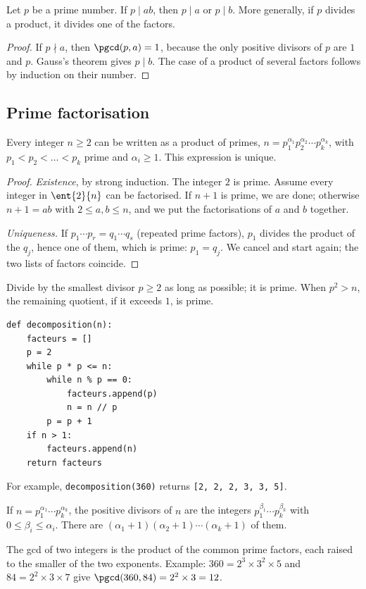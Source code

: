 \begin{theorem}
Let $p$ be a prime number. If $p\mid ab$, then $p\mid a$ or $p\mid b$. More generally, if $p$ divides a product, it divides one of the factors.
\end{theorem}
\begin{proof}
If $p\nmid a$, then $\pgcd(p,a)=1$, because the only positive divisors of $p$ are $1$ and $p$. Gauss's theorem gives $p\mid b$. The case of a product of several factors follows by induction on their number.
\end{proof}

\subsection{Prime factorisation}
\begin{theorem}[Factorisation]
Every integer $n\ge2$ can be written as a product of primes, $n=p_1^{\alpha_1}p_2^{\alpha_2}\cdots p_k^{\alpha_k}$, with $p_1<p_2<\dots<p_k$ prime and $\alpha_i\ge1$. This expression is unique.
\end{theorem}
\begin{proof}
\emph{Existence}, by strong induction. The integer $2$ is prime. Assume every integer in $\ent{2}{n}$ can be factorised. If $n+1$ is prime, we are done; otherwise $n+1=ab$ with $2\le a,b\le n$, and we put the factorisations of $a$ and $b$ together.\par
\emph{Uniqueness.} If $p_1\cdots p_r=q_1\cdots q_s$ (repeated prime factors), $p_1$ divides the product of the $q_j$, hence one of them, which is prime: $p_1=q_j$. We cancel and start again; the two lists of factors coincide.
\end{proof}
\begin{keypoint}
Divide by the smallest divisor $p\ge2$ as long as possible; it is prime. When $p^2>n$, the remaining quotient, if it exceeds $1$, is prime.
\begin{lstlisting}
def decomposition(n):
    facteurs = []
    p = 2
    while p * p <= n:
        while n % p == 0:
            facteurs.append(p)
            n = n // p
        p = p + 1
    if n > 1:
        facteurs.append(n)
    return facteurs
\end{lstlisting}
For example, \texttt{decomposition(360)} returns \texttt{[2, 2, 2, 3, 3, 5]}.
\end{keypoint}
\begin{theorem}[Divisors]
If $n=p_1^{\alpha_1}\cdots p_k^{\alpha_k}$, the positive divisors of $n$ are the integers $p_1^{\beta_1}\cdots p_k^{\beta_k}$ with $0\le\beta_i\le\alpha_i$. There are $(\alpha_1+1)(\alpha_2+1)\cdots(\alpha_k+1)$ of them.
\end{theorem}
\begin{method}
The gcd of two integers is the product of the common prime factors, each raised to the smaller of the two exponents. Example: $360=2^3\times3^2\times5$ and $84=2^2\times3\times7$ give $\pgcd(360,84)=2^2\times3=12$.
\end{method}

